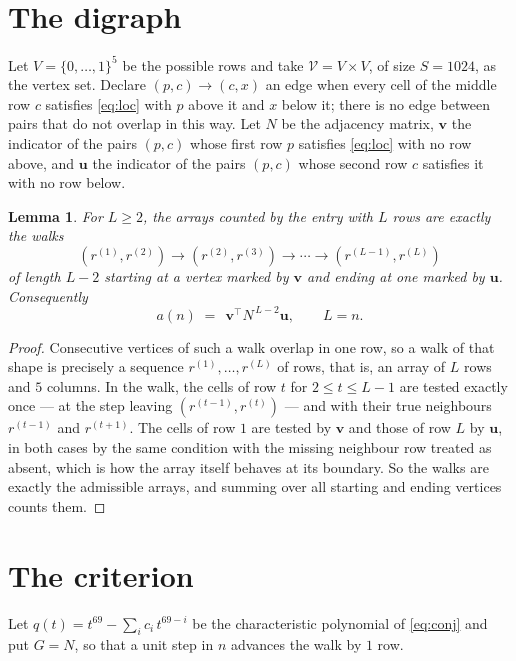 \documentclass[11pt,a4paper]{article}
\theoremstyle{plain}
\newtheorem{lemma}[theorem]{Lemma}
\theoremstyle{definition}
\begin{document}
\section{The digraph}

Let $V=\{0,\dots,1\}^{5}$ be the possible rows and take
$\mathcal V=V\times V$, of size $S=1024$, as the vertex set. Declare $(p,c)\to(c,x)$ an edge
when every cell of the middle row $c$ satisfies \eqref{eq:loc} with $p$ above it and $x$
below it; there is no edge between pairs that do not overlap in this way. Let $N$ be the
adjacency matrix, $\mathbf{v}$ the indicator of the pairs $(p,c)$ whose first row $p$
satisfies \eqref{eq:loc} with no row above, and $\mathbf{u}$ the indicator of
the pairs $(p,c)$ whose second row $c$ satisfies it with no row below.

\begin{lemma}\label{lem:walk}
For $L\ge2$, the arrays counted by the entry with $L$ rows are exactly the walks
\[
(r^{(1)},r^{(2)})\to(r^{(2)},r^{(3)})\to\cdots\to(r^{(L-1)},r^{(L)})
\]
of length $L-2$ starting at a vertex marked by $\mathbf{v}$ and ending at one marked by
$\mathbf{u}$. Consequently
\[
a(n)\;=\;\,\mathbf{v}^{\!\top}N^{\,L-2}\mathbf{u},\qquad L=n .
\]
\end{lemma}

\begin{proof}
Consecutive vertices of such a walk overlap in one row, so a walk of that shape is
precisely a sequence $r^{(1)},\dots,r^{(L)}$ of rows, that is, an array of $L$ rows
and $5$ columns. In the walk, the cells of row $t$ for $2\le t\le L-1$ are tested
exactly once --- at the step leaving $(r^{(t-1)},r^{(t)})$ --- and with their true
neighbours $r^{(t-1)}$ and $r^{(t+1)}$. The cells of row $1$ are tested by
$\mathbf{v}$ and those of row $L$ by $\mathbf{u}$, in both cases by the same condition
with the missing neighbour row treated as absent, which is how the array itself behaves at
its boundary. So the walks are exactly the admissible arrays, and summing over all starting
and ending vertices counts them.
\end{proof}

\section{The criterion}

Let $q(t)=t^{69}-\sum_i c_i\,t^{69-i}$ be the characteristic polynomial of
\eqref{eq:conj} and put $G=N$, so that a unit step in $n$ advances the walk by
$1$ row.
\end{document}
